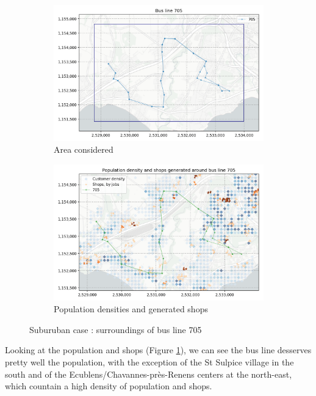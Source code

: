 \begin{figure}
     \centering
     \begin{subfigure}{0.8\linewidth}
        \includegraphics[width=\linewidth]{../fig/l705_area.png}
        \caption{Area considered}
     \end{subfigure}
     \begin{subfigure}{0.8\linewidth}
        \includegraphics[width=\linewidth]{../fig/l705_densities.png}
        \caption{Population densities and generated shops}
        \label{fig:suburban_densities}
     \end{subfigure}
     \caption{Suburuban case : surroundings of bus line 705}
     \label{fig:suburban_case}
\end{figure}

Looking at the population and shops (Figure \ref{fig:suburban_densities}), we can see the bus line desserves pretty well the population, with the exception of the St Sulpice village in the south and of the Ecublens/Chavannes-près-Renens centers at the north-east, which countain a high density of population and shops.

